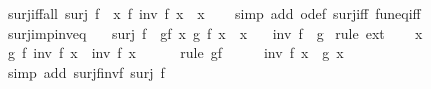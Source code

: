 \begin{isabellebody}
\endisatagproof
{\isafoldproof}%
%
\isadelimproof
\isanewline
%
\endisadelimproof
\isanewline
{}\isamarkupfalse%
\ surj{\isacharunderscore}{\kern0pt}iff{\isacharunderscore}{\kern0pt}all{\isacharcolon}{\kern0pt}\ {\isachardoublequoteopen}surj\ f\ {\isasymlongleftrightarrow}\ {\isacharparenleft}{\kern0pt}{\isasymforall}x{\isachardot}{\kern0pt}\ f\ {\isacharparenleft}{\kern0pt}inv\ f\ x{\isacharparenright}{\kern0pt}\ {\isacharequal}{\kern0pt}\ x{\isacharparenright}{\kern0pt}{\isachardoublequoteclose}\isanewline
%
\isadelimproof
\ \ %
\endisadelimproof
%
\isatagproof
{}\isamarkupfalse%
\ {\isacharparenleft}{\kern0pt}simp\ add{\isacharcolon}{\kern0pt}\ o{\isacharunderscore}{\kern0pt}def\ surj{\isacharunderscore}{\kern0pt}iff\ fun{\isacharunderscore}{\kern0pt}eq{\isacharunderscore}{\kern0pt}iff{\isacharparenright}{\kern0pt}%
\endisatagproof
{\isafoldproof}%
%
\isadelimproof
\isanewline
%
\endisadelimproof
\isanewline
{}\isamarkupfalse%
\ surj{\isacharunderscore}{\kern0pt}imp{\isacharunderscore}{\kern0pt}inv{\isacharunderscore}{\kern0pt}eq{\isacharcolon}{\kern0pt}\isanewline
\ \ \ {\isachardoublequoteopen}surj\ f{\isachardoublequoteclose}\ \ gf{\isacharcolon}{\kern0pt}\ {\isachardoublequoteopen}{\isasymAnd}x{\isachardot}{\kern0pt}\ g\ {\isacharparenleft}{\kern0pt}f\ x{\isacharparenright}{\kern0pt}\ {\isacharequal}{\kern0pt}\ x{\isachardoublequoteclose}\isanewline
\ \ \ {\isachardoublequoteopen}inv\ f\ {\isacharequal}{\kern0pt}\ g{\isachardoublequoteclose}\isanewline
%
\isadelimproof
%
\endisadelimproof
%
\isatagproof
{}\isamarkupfalse%
\ {\isacharparenleft}{\kern0pt}rule\ ext{\isacharparenright}{\kern0pt}\isanewline
\ \ \isamarkupfalse%
\ x\isanewline
\ \ \isamarkupfalse%
\ {\isachardoublequoteopen}g\ {\isacharparenleft}{\kern0pt}f\ {\isacharparenleft}{\kern0pt}inv\ f\ x{\isacharparenright}{\kern0pt}{\isacharparenright}{\kern0pt}\ {\isacharequal}{\kern0pt}\ inv\ f\ x{\isachardoublequoteclose}\isanewline
\ \ \ \ \isamarkupfalse%
\ {\isacharparenleft}{\kern0pt}rule\ gf{\isacharparenright}{\kern0pt}\isanewline
\ \ \isamarkupfalse%
\ \isamarkupfalse%
\ {\isachardoublequoteopen}inv\ f\ x\ {\isacharequal}{\kern0pt}\ g\ x{\isachardoublequoteclose}\isanewline
\ \ \ \ \isamarkupfalse%
\ {\isacharparenleft}{\kern0pt}simp\ add{\isacharcolon}{\kern0pt}\ surj{\isacharunderscore}{\kern0pt}f{\isacharunderscore}{\kern0pt}inv{\isacharunderscore}{\kern0pt}f\ {\isacartoucheopen}surj\ f{\isacartoucheclose}{\isacharparenright}{\kern0pt}\isanewline

\end{isabellebody}
